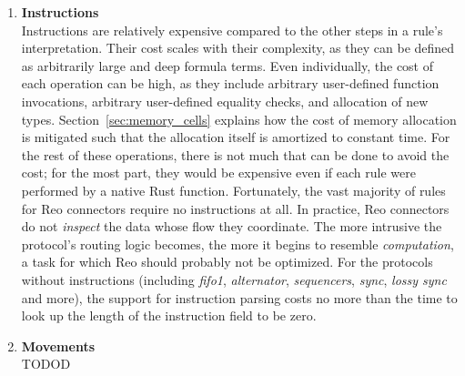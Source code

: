 \begin{enumerate}
	\item \textbf{Instructions}\\
	Instructions are relatively expensive compared to the other steps in a rule's interpretation. Their cost scales with their complexity, as they can be defined as arbitrarily large and deep formula terms. Even individually, the cost of each operation can be high, as they include arbitrary user-defined function invocations, arbitrary user-defined equality checks, and allocation of new types. Section~\ref{sec:memory_cells} explains how the cost of memory allocation is mitigated such that the allocation itself is amortized to constant time. For the rest of these operations, there is not much that can be done to avoid the cost; for the most part, they would be expensive even if each rule were performed by a native Rust function. Fortunately, the vast majority of rules for Reo connectors require no instructions at all. In practice, Reo connectors do not \textit{inspect} the data whose flow they coordinate. The more intrusive the protocol's routing logic becomes, the more it begins to resemble \textit{computation}, a task for which Reo should probably not be optimized. For the protocols without instructions (including \textit{fifo1}, \textit{alternator}, \textit{sequencers}, \textit{sync}, \textit{lossy sync} and more), the support for instruction parsing costs no more than the time to look up the length of the instruction field to be zero.
	 
	 \item \textbf{Movements}\\
	 TODOD
	
\end{enumerate}

